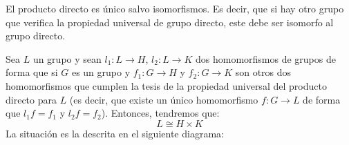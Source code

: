 El producto directo es único salvo isomorfismos. Es decir, que si hay otro grupo que verifica la propiedad universal de grupo directo, este debe ser isomorfo al grupo directo.
\begin{teo}
    Sea $L$ un grupo y sean $l_1:L\to H$, $l_2:L\to K$ dos homomorfismos de grupos de forma que si $G$ es un grupo y $f_1:G\to H$ y $f_2:G\to K$ son otros dos homomorfismos que cumplen la tesis de la propiedad universal del producto directo para $L$ (es decir, que existe un único homomorfismo $f:G\to L$ de forma que $l_1f=f_1$ y $l_2f = f_2$). Entonces, tendremos que:
    \begin{equation*}
        L\cong H\times K
    \end{equation*}
    La situación es la descrita en el siguiente diagrama:
   \begin{figure}[H]
       \centering
   \end{figure}


\end{teo}
